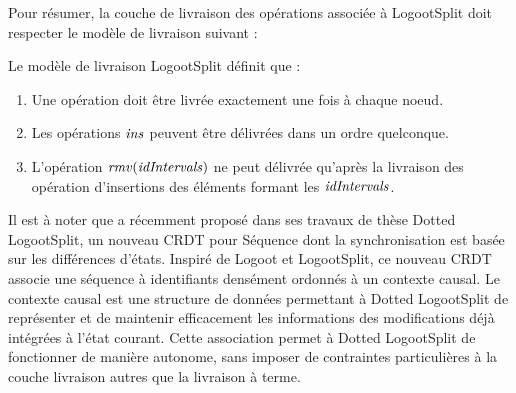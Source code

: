 Pour résumer, la couche de livraison des opérations associée à LogootSplit doit respecter le modèle de livraison suivant :

\begin{definition}
  Le modèle de livraison LogootSplit définit que :
  \begin{enumerate}
    \item Une opération doit être livrée exactement une fois à chaque noeud.
    \item Les opérations $\mathit{ins}$ peuvent être délivrées dans un ordre quelconque.
    \item L'opération $\mathit{rmv}(\mathit{idIntervals})$ ne peut délivrée qu'après la livraison des opération d'insertions des éléments formant les $\mathit{idIntervals}$.
  \end{enumerate}
\end{definition}

Il est à noter que \textcite{2021-these-vic} a récemment proposé dans ses travaux de thèse Dotted LogootSplit, un nouveau \ac{CRDT} pour Séquence dont la synchronisation est basée sur les différences d'états.
Inspiré de Logoot et LogootSplit, ce nouveau \ac{CRDT} associe une séquence à identifiants densément ordonnés à un contexte causal.
Le contexte causal est une structure de données permettant à Dotted LogootSplit de représenter et de maintenir efficacement les informations des modifications déjà intégrées à l'état courant.
Cette association permet à Dotted LogootSplit de fonctionner de manière autonome, sans imposer de contraintes particulières à la couche livraison autres que la livraison à terme.
